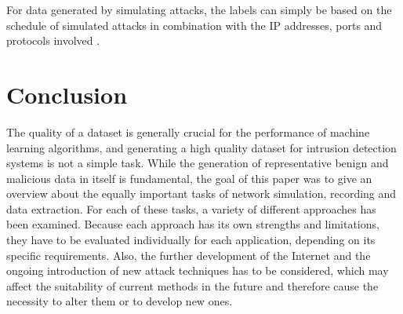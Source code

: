 \documentclass[conference]{IEEEtran}
\begin{document}
For data generated by simulating attacks, the labels can simply be based on the schedule of simulated attacks in combination with the IP addresses, ports and protocols involved \cite{Ids2018}.

\section{Conclusion}

The quality of a dataset is generally crucial for the performance of machine learning algorithms, and generating a high quality dataset for intrusion detection systems is not a simple task. While the generation of representative benign and malicious data in itself is fundamental, the goal of this paper was to give an overview about the equally important tasks of network simulation, recording and data extraction. For each of these tasks, a variety of different approaches has been examined. Because each approach has its own strengths and limitations, they have to be evaluated individually for each application, depending on its specific requirements. Also, the further development of the Internet and the ongoing introduction of new attack techniques has to be considered, which may affect the suitability of current methods in the future and therefore cause the necessity to alter them or to develop new ones.
\end{document}
